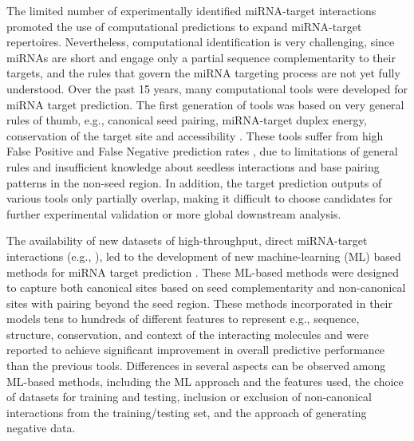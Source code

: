 The limited number of experimentally identified miRNA-target interactions promoted the use of computational predictions to expand miRNA-target repertoires. Nevertheless, computational identification is very challenging, since miRNAs are short and engage only a partial sequence complementarity to their targets, and the rules that govern the miRNA targeting process are not yet fully understood. 
Over the past 15 years, many computational tools were developed for miRNA target prediction. The first generation of tools was based on very general rules of thumb, e.g., canonical seed pairing, miRNA-target duplex energy, conservation of the target site and accessibility \cite{kruger2006rnahybrid, enright2003microrna, lewis2005conserved, kertesz2007role}. These tools suffer from high False Positive and False Negative prediction rates \cite{pinzon2017microrna, oliveira2017combining, fridrich2019too, min2010got}, due to limitations of general rules and insufficient knowledge about seedless interactions and base pairing patterns in the non-seed region. In addition, the target prediction outputs of various tools only partially overlap, making it difficult to choose candidates for further experimental validation or more global downstream analysis.


The availability of new datasets of high-throughput, direct miRNA-target interactions (e.g., \cite{scheel2017global, grosswendt2014unambiguous, darnell_moore2015mirna, helwak2013mapping}), led to the development of new machine-learning (ML) based methods for miRNA target prediction \cite{lu2016learning, ding2016tarpmir, pla2018miraw, wen2018deepmirtar, cheng2015mirtdl, menor2014mirmark}. These ML-based methods were designed to capture both canonical sites based on seed complementarity and non-canonical sites with pairing beyond the seed region. These methods incorporated in their models tens to hundreds of different features to represent e.g., sequence, structure, conservation, and context of the interacting molecules and were reported to achieve significant improvement in overall predictive performance than the previous tools. Differences in several aspects can be observed among ML-based methods, including the ML approach and the features used, the choice of datasets for training and testing, inclusion or exclusion of non-canonical interactions from the training/testing set, and the approach of generating negative data. 



